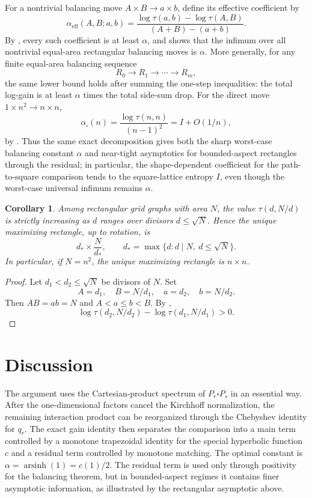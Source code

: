 \documentclass[11pt]{article}
\numberwithin{equation}{section}
\newtheorem{corollary}[corollary]{Corollary}
\DeclareMathOperator{\arsinh}{arsinh}
\begin{document}
For a nontrivial balancing move $A\times B\to a\times b$, define its effective coefficient by
\[
  \alpha_{\mathrm{eff}}(A,B;a,b)
  =
  \frac{\log\tau(a,b)-\log\tau(A,B)}
  {(A+B)-(a+b)}.
\]
By , every such coefficient is at least $\alpha$, and  shows that the infimum over all nontrivial equal-area rectangular balancing moves is $\alpha$. More generally, for any finite equal-area balancing sequence
\[
  R_0\to R_1\to\cdots\to R_m,
\]
the same lower bound holds after summing the one-step inequalities: the total log-gain is at least $\alpha$ times the total side-sum drop. For the direct move $1\times n^2\to n\times n$,
\[
  \alpha_{\square}(n)
  =
  \frac{\log\tau(n,n)}{(n-1)^2}
  =
  I+O(1/n),
\]
by . Thus the same exact decomposition gives both the sharp worst-case balancing constant $\alpha$ and near-tight asymptotics for bounded-aspect rectangles through the residual; in particular, the shape-dependent coefficient for the path-to-square comparison tends to the square-lattice entropy $I$, even though the worst-case universal infimum remains $\alpha$.

\begin{corollary}\label{cor:square-max}
Among rectangular grid graphs with area $N$, the value $\tau(d,N/d)$ is strictly increasing as $d$ ranges over divisors $d\le\sqrt N$. Hence the unique maximizing rectangle, up to rotation, is
\[
  d_*\times \frac{N}{d_*},
  \qquad
  d_*=\max\{d:d\mid N,\ d\le\sqrt N\}.
\]
In particular, if $N=n^2$, the unique maximizing rectangle is $n\times n$.
\end{corollary}

\begin{proof}
Let $d_1<d_2\le\sqrt N$ be divisors of $N$. Set
\[
  A=d_1,\quad B=N/d_1,\quad a=d_2,\quad b=N/d_2.
\]
Then $AB=ab=N$ and $A<a\le b<B$. By ,
\[
  \log\tau(d_2,N/d_2)-\log\tau(d_1,N/d_1)>0.
\]
\end{proof}

\section{Discussion}\label{sec:discussion}

The argument uses the Cartesian-product spectrum of $P_r\square P_s$ in an essential way. After the one-dimensional factors cancel the Kirchhoff normalization, the remaining interaction product can be reorganized through the Chebyshev identity for $q_r$. The exact gain identity then separates the comparison into a main term controlled by a monotone trapezoidal identity for the special hyperbolic function $c$ and a residual term controlled by monotone matching. The optimal constant is $\alpha=\arsinh(1)=c(1)/2$.
The residual term is used only through positivity for the balancing theorem, but in bounded-aspect regimes it contains finer asymptotic information, as illustrated by the rectangular asymptotic above.
\end{document}
